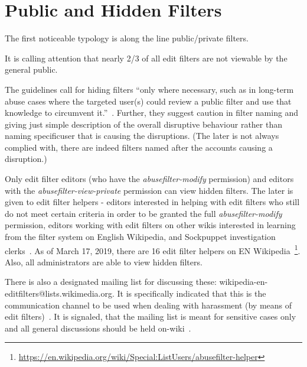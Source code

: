 \section{Public and Hidden Filters}

The first noticeable typology is along the line public/private filters.

It is calling attention that nearly 2/3 of all edit filters are not viewable by the general public.

The guidelines call for hiding filters ``only where necessary, such as in long-term abuse cases where the targeted user(s) could review a public filter and use that knowledge to circumvent it.''~\cite{Wikipedia:EditFilter}.
Further, they suggest caution in filter naming and giving just simple description of the overall disruptive behaviour rather than naming specificuser that is causing the disruptions.
(The later is not always complied with, there are indeed filters named after the accounts causing a disruption.)

Only edit filter editors (who have the \emph{abusefilter-modify} permission) and editors with the \emph{abusefilter-view-private} permission can view hidden filters.
The later is given to edit filter helpers - editors interested in helping with edit filters who still do not meet certain criteria in order to be granted the full \emph{abusefilter-modify} permission, editors working with edit filters on other wikis interested in learning from the filter system on English Wikipedia, and Sockpuppet investigation clerks~\cite{Wikipedia:EditFilterHelper}.
As of March 17, 2019, there are 16 edit filter helpers on EN Wikipedia~\footnote{\url{https://en.wikipedia.org/wiki/Special:ListUsers/abusefilter-helper}}.
Also, all administrators are able to view hidden filters.

There is also a designated mailing list for discussing these: wikipedia-en-editfilters@lists.wikimedia.org.
It is specifically indicated that this is the communication channel to be used when dealing with harassment (by means of edit filters)~\cite{Wikipedia:EditFilter}.
It is signaled, that the mailing list is meant for sensitive cases only and all general discussions should be held on-wiki~\cite{Wikipedia:EditFilter}.

